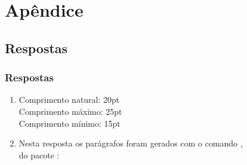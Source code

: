 \documentclass[handout,10pt]{beamer}
\begin{document}
{
}
\section{Apêndice}
\subsection{Respostas}
\begin{frame}[fragile,label=respostas]
	\frametitle{Respostas}
	\scriptsize
	
	\begin{enumerate}
	\item Comprimento natural: \unit{20}{pt}\\
	      Comprimento máximo: \unit{25}{pt}\\
	      Comprimento mínimo: \unit{15}{pt}
	      
	\item Nesta resposta os parágrafos foram gerados com o comando ,\\do pacote :
	
		\begin{LaTeXcode}
		\newlength{\meucomp}
		
		\setlength{\meucomp}{2\parindent}
		\lipsum[1] %
		
		\setlength{\parindent}{5 cm}
		\lipsum[2] %
		
		\setlength{\parindent}{\meucomp}
		\lipsum[3] %
		\end{LaTeXcode}
	\end{enumerate}

\end{frame}
\end{document}
